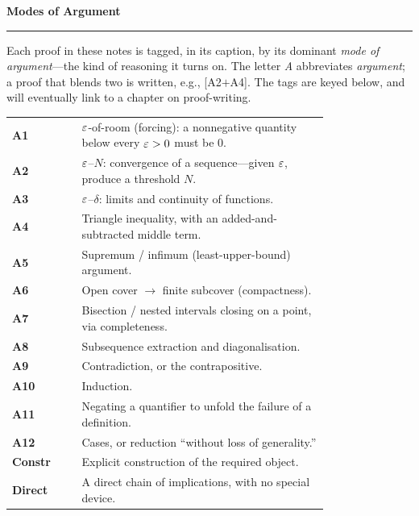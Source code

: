 \documentclass[11pt,twoside]{book}
\begin{document}
\cleardoublepage
{}
\thispagestyle{plain}
{\LARGE\bfseries Modes of Argument}\par\smallskip
\noindent\rule{\linewidth}{0.4pt}\par\medskip
\noindent Each proof in these notes is tagged, in its caption, by its dominant \emph{mode of
argument}---the kind of reasoning it turns on. The letter \emph{A} abbreviates \emph{argument};
a proof that blends two is written, e.g., \textsf{[A2$+$A4]}. The tags are keyed below, and will
eventually link to a chapter on proof-writing.\par\medskip
\noindent\begin{tabular}{@{}l@{\hspace{0.9em}}p{0.78\linewidth}@{}}
\textbf{A1}  & $\varepsilon$-of-room (forcing): a nonnegative quantity below every $\varepsilon>0$ must be $0$.\\[3pt]
\textbf{A2}  & $\varepsilon$--$N$: convergence of a sequence---given $\varepsilon$, produce a threshold $N$.\\[3pt]
\textbf{A3}  & $\varepsilon$--$\delta$: limits and continuity of functions.\\[3pt]
\textbf{A4}  & Triangle inequality, with an added-and-subtracted middle term.\\[3pt]
\textbf{A5}  & Supremum / infimum (least-upper-bound) argument.\\[3pt]
\textbf{A6}  & Open cover $\to$ finite subcover (compactness).\\[3pt]
\textbf{A7}  & Bisection / nested intervals closing on a point, via completeness.\\[3pt]
\textbf{A8}  & Subsequence extraction and diagonalisation.\\[3pt]
\textbf{A9}  & Contradiction, or the contrapositive.\\[3pt]
\textbf{A10} & Induction.\\[3pt]
\textbf{A11} & Negating a quantifier to unfold the failure of a definition.\\[3pt]
\textbf{A12} & Cases, or reduction ``without loss of generality.''\\[3pt]
\textbf{Constr} & Explicit construction of the required object.\\[3pt]
\textbf{Direct} & A direct chain of implications, with no special device.\\
\end{tabular}
\end{document}
